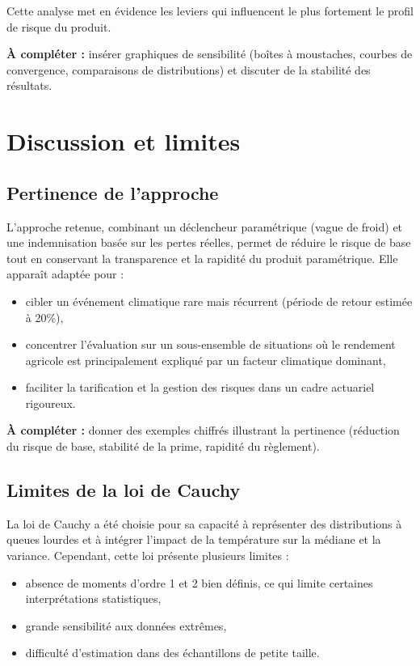 \documentclass[11pt,a4paper,openright,twoside]{report}
\begin{document}
Cette analyse met en évidence les leviers qui influencent le plus fortement le profil de risque du produit.  

\textbf{À compléter :} insérer graphiques de sensibilité (boîtes à moustaches, courbes de convergence, comparaisons de distributions) et discuter de la stabilité des résultats.



\chapter{Discussion et limites}

\section{Pertinence de l’approche}
L’approche retenue, combinant un déclencheur paramétrique (vague de froid) et une indemnisation basée sur les pertes réelles, permet de réduire le risque de base tout en conservant la transparence et la rapidité du produit paramétrique.  
Elle apparaît adaptée pour :
\begin{itemize}
    \item cibler un événement climatique rare mais récurrent (période de retour estimée à 20\%),
    \item concentrer l’évaluation sur un sous-ensemble de situations où le rendement agricole est principalement expliqué par un facteur climatique dominant,
    \item faciliter la tarification et la gestion des risques dans un cadre actuariel rigoureux.
\end{itemize}

\textbf{À compléter :} donner des exemples chiffrés illustrant la pertinence (réduction du risque de base, stabilité de la prime, rapidité du règlement).

\section{Limites de la loi de Cauchy}
La loi de Cauchy a été choisie pour sa capacité à représenter des distributions à queues lourdes et à intégrer l’impact de la température sur la médiane et la variance.  
Cependant, cette loi présente plusieurs limites :
\begin{itemize}
    \item absence de moments d’ordre 1 et 2 bien définis, ce qui limite certaines interprétations statistiques,
    \item grande sensibilité aux données extrêmes,
    \item difficulté d’estimation dans des échantillons de petite taille.
\end{itemize}
\end{document}
